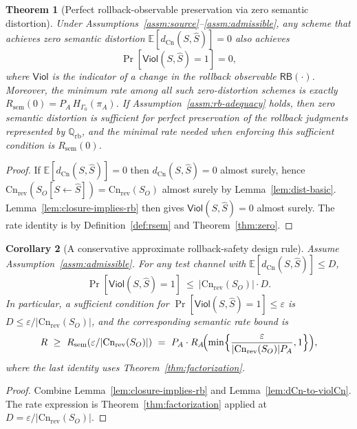 \documentclass[twoside]{article}
\newtheorem{theorem}{Theorem}[section]
\newtheorem{corollary}[theorem]{Corollary}
\newcommand{\Cn}{\mathrm{Cn}}
\newcommand{\sem}{\mathrm{sem}}
\newcommand{\E}{\mathbb{E}}
\newcommand{\1}{\mathbf{1}}
\begin{document}
\begin{theorem}[Perfect rollback-observable preservation via zero semantic distortion]
\label{thm:perfect-rb-observable-from-Rsem}
Under Assumptions~\ref{assm:source}--\ref{assm:admissible}, any scheme that achieves
zero semantic distortion \(\E[d_{\Cn}(S,\hat S)]=0\) also achieves
\[
\Pr[\mathsf{Viol}(S,\hat S)=1]=0,
\]
where \(\mathsf{Viol}\) is the indicator of a change in the rollback observable \(\mathsf{RB}(\cdot)\).
Moreover, the minimum rate among all such zero-distortion schemes is exactly
\(R_{\sem}(0)=P_A\,H_{\Gamma_0}(\pi_A)\).
If Assumption~\ref{assm:rb-adequacy} holds, then zero semantic distortion is \emph{sufficient}
for perfect preservation of the rollback judgments represented by \(\mathbb{Q}_{\mathrm{rb}}\),
and the minimal rate needed when enforcing this sufficient condition is \(R_{\sem}(0)\).
\end{theorem}

\begin{proof}
If \(\E[d_{\Cn}(S,\hat S)]=0\) then \(d_{\Cn}(S,\hat S)=0\) almost surely, hence \(\Cn_{\mathrm{rev}}(S_O[S\leftarrow \hat S])=\Cn_{\mathrm{rev}}(S_O)\)
almost surely by Lemma~\ref{lem:dist-basic}. Lemma~\ref{lem:closure-implies-rb} then gives \(\mathsf{Viol}(S,\hat S)=0\) almost surely.
The rate identity is by Definition~\ref{def:rsem} and Theorem~\ref{thm:zero}.
\end{proof}

\begin{corollary}[A conservative approximate rollback-safety design rule]
\label{cor:approx-rb-safety-from-Rsem}
Assume Assumption~\ref{assm:admissible}. For any test channel with \(\E[d_{\Cn}(S,\hat S)]\le D\),
\[
\Pr[\mathsf{Viol}(S,\hat S)=1]\ \le\ |\Cn_{\mathrm{rev}}(S_O)|\cdot D.
\]
In particular, a sufficient condition for \(\Pr[\mathsf{Viol}(S,\hat S)=1]\le \varepsilon\) is
\(D\le \varepsilon/|\Cn_{\mathrm{rev}}(S_O)|\), and the corresponding semantic rate bound is
\[
R \ \ge\ R_{\sem}(\varepsilon/|\Cn_{\mathrm{rev}}(S_O)|)
\ =\ P_A\cdot R_A\!\Bigl(\min\Bigl\{\frac{\varepsilon}{|\Cn_{\mathrm{rev}}(S_O)|P_A},1\Bigr\}\Bigr),
\]
where the last identity uses Theorem~\ref{thm:factorization}.
\end{corollary}

\begin{proof}
Combine Lemma~\ref{lem:closure-implies-rb} and Lemma~\ref{lem:dCn-to-violCn}.
The rate expression is Theorem~\ref{thm:factorization} applied at \(D=\varepsilon/|\Cn_{\mathrm{rev}}(S_O)|\).
\end{proof}
\end{document}
